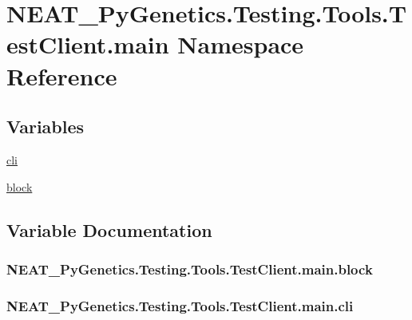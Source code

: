 \hypertarget{namespaceNEAT__PyGenetics_1_1Testing_1_1Tools_1_1TestClient_1_1main}{}\section{N\+E\+A\+T\+\_\+\+Py\+Genetics.\+Testing.\+Tools.\+Test\+Client.\+main Namespace Reference}
\label{namespaceNEAT__PyGenetics_1_1Testing_1_1Tools_1_1TestClient_1_1main}
\subsection*{Variables}
\begin{DoxyCompactItemize}
\item 
\hyperlink{namespaceNEAT__PyGenetics_1_1Testing_1_1Tools_1_1TestClient_1_1main_a33e27407ef8eddad7ab265affc7029e5}{cli}
\item 
\hyperlink{namespaceNEAT__PyGenetics_1_1Testing_1_1Tools_1_1TestClient_1_1main_a680ae3960f46c1999db78adcfbcbf7df}{block}
\end{DoxyCompactItemize}


\subsection{Variable Documentation}
\subsubsection[{\texorpdfstring{block}{block}}]{\setlength{\rightskip}{0pt plus 5cm}N\+E\+A\+T\+\_\+\+Py\+Genetics.\+Testing.\+Tools.\+Test\+Client.\+main.\+block}\hypertarget{namespaceNEAT__PyGenetics_1_1Testing_1_1Tools_1_1TestClient_1_1main_a680ae3960f46c1999db78adcfbcbf7df}{}\label{namespaceNEAT__PyGenetics_1_1Testing_1_1Tools_1_1TestClient_1_1main_a680ae3960f46c1999db78adcfbcbf7df}
\subsubsection[{\texorpdfstring{cli}{cli}}]{\setlength{\rightskip}{0pt plus 5cm}N\+E\+A\+T\+\_\+\+Py\+Genetics.\+Testing.\+Tools.\+Test\+Client.\+main.\+cli}\hypertarget{namespaceNEAT__PyGenetics_1_1Testing_1_1Tools_1_1TestClient_1_1main_a33e27407ef8eddad7ab265affc7029e5}{}\label{namespaceNEAT__PyGenetics_1_1Testing_1_1Tools_1_1TestClient_1_1main_a33e27407ef8eddad7ab265affc7029e5}
